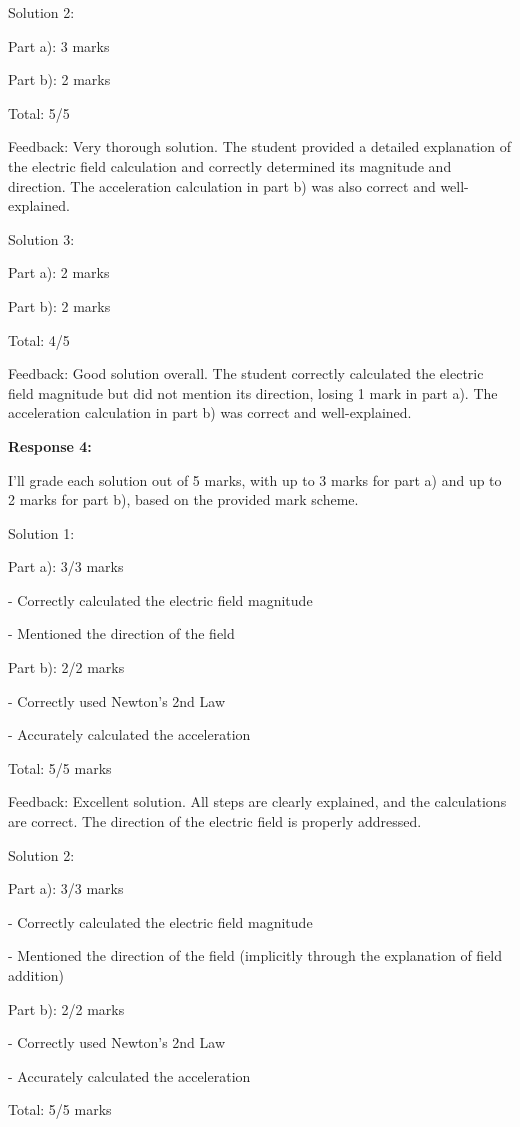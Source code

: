 \documentclass[a4paper,11pt]{article}
\begin{document}
Solution 2:

Part a): 3 marks

Part b): 2 marks

Total: 5/5

Feedback: Very thorough solution. The student provided a detailed explanation of the electric field calculation and correctly determined its magnitude and direction. The acceleration calculation in part b) was also correct and well-explained.

Solution 3:

Part a): 2 marks

Part b): 2 marks

Total: 4/5

Feedback: Good solution overall. The student correctly calculated the electric field magnitude but did not mention its direction, losing 1 mark in part a). The acceleration calculation in part b) was correct and well-explained.

\bigskip
\textbf{Response 4:}

I'll grade each solution out of 5 marks, with up to 3 marks for part a) and up to 2 marks for part b), based on the provided mark scheme.

Solution 1:

Part a): 3/3 marks

- Correctly calculated the electric field magnitude

- Mentioned the direction of the field

Part b): 2/2 marks

- Correctly used Newton's 2nd Law

- Accurately calculated the acceleration

Total: 5/5 marks

Feedback: Excellent solution. All steps are clearly explained, and the calculations are correct. The direction of the electric field is properly addressed.

Solution 2:

Part a): 3/3 marks

- Correctly calculated the electric field magnitude

- Mentioned the direction of the field (implicitly through the explanation of field addition)

Part b): 2/2 marks

- Correctly used Newton's 2nd Law

- Accurately calculated the acceleration

Total: 5/5 marks
\end{document}
